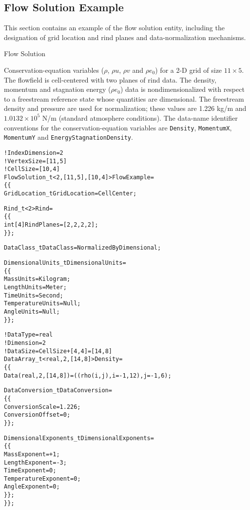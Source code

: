 \subsection{Flow Solution Example}
\label{s:flow_example}

This section contains an example of the flow solution entity, including
the designation of grid location and rind planes and data-normalization
mechanisms.

\begin{example}{Flow Solution}
\label{ex:flow}

Conservation-equation variables ($\rho$, $\rho u$, $\rho v$ and
$\rho e_0$) for a 2-D grid of size $11\times5$.
The flowfield is cell-centered with two planes of rind data.
The density, momentum and stagnation energy ($\rho e_0$) data is
nondimensionalized with respect to a freestream reference state whose
quantities are dimensional.
The freestream density and pressure are used for normalization; these
values are 1.226 kg/m and $1.0132 \!\times\! 10^{5}$ N/m
(standard atmosphere conditions).
The data-name identifier conventions for the conservation-equation
variables are \texttt{Density}, \texttt{MomentumX}, \texttt{MomentumY} and
\texttt{EnergyStagnationDensity}.
\begin{alltt}
  !  IndexDimension = 2
  !  VertexSize = [11,5]
  !  CellSize = [10,4]
  FlowSolution\_t<2, [11,5], [10,4]> FlowExample =
    \{\{
    GridLocation\_t GridLocation = CellCenter ;

    Rind\_t<2> Rind =
      \{\{
      int[4] RindPlanes = [2,2,2,2] ;
      \}\} ;

    DataClass\_t DataClass = NormalizedByDimensional ;
    
    DimensionalUnits\_t DimensionalUnits = 
      \{\{ 
      MassUnits        = Kilogram ;
      LengthUnits      = Meter ;
      TimeUnits        = Second ;
      TemperatureUnits = Null ;
      AngleUnits       = Null ;
      \}\} ;

    !  DataType = real
    !  Dimension = 2
    !  DataSize = CellSize + [4,4] = [14,8]
    DataArray\_t<real, 2, [14,8]> Density =
      \{\{
      Data(real, 2, [14,8]) = ((rho(i,j), i=-1,12), j=-1,6) ;

      DataConversion\_t DataConversion =
        \{\{
        ConversionScale  = 1.226 ;
        ConversionOffset = 0 ;
        \}\} ;

      DimensionalExponents\_t DimensionalExponents =
        \{\{
        MassExponent        = +1 ;
        LengthExponent      = -3 ;
        TimeExponent        =  0 ;
        TemperatureExponent =  0 ;
        AngleExponent       =  0 ;
        \}\} ;
      \}\} ;


\end{alltt}
\end{example}
